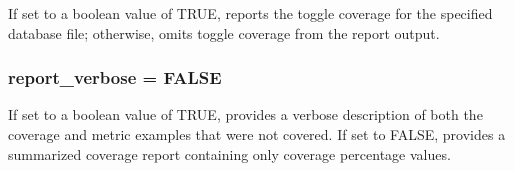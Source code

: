 If set to a boolean value of TRUE, reports the toggle coverage for the specified database file; otherwise, omits toggle coverage from the report output. 
\subsubsection{ report\_\-verbose = FALSE}\label{report_8c_a4}


If set to a boolean value of TRUE, provides a verbose description of both the coverage and metric examples that were not covered. If set to FALSE, provides a summarized coverage report containing only coverage percentage values. 